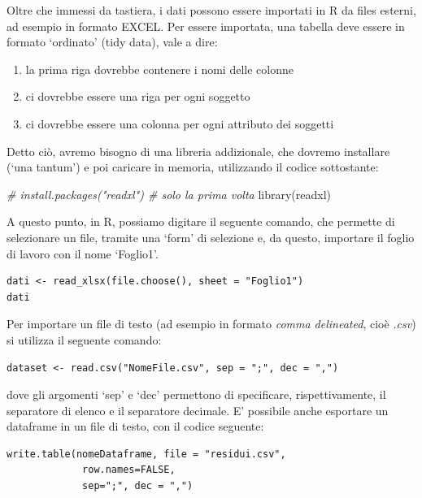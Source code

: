 \documentclass[
  12pt,
]{book}
\newenvironment{Shaded}{\begin{snugshade}}{\end{snugshade}}
\newcommand{\CommentTok}[1]{\textcolor[rgb]{0.56,0.35,0.01}{\textit{#1}}}
\newcommand{\FunctionTok}[1]{\textcolor[rgb]{0.00,0.00,0.00}{#1}}
\newcommand{\NormalTok}[1]{#1}
\providecommand{\tightlist}{%
  \setlength{\itemsep}{0pt}\setlength{\parskip}{0pt}}
\begin{document}
Oltre che immessi da tastiera, i dati possono essere importati in R da files esterni, ad esempio in formato EXCEL. Per essere importata, una tabella deve essere in formato `ordinato' (tidy data), vale a dire:

\begin{enumerate}
\def\labelenumi{\arabic{enumi}.}
\tightlist
\item
  la prima riga dovrebbe contenere i nomi delle colonne
\item
  ci dovrebbe essere una riga per ogni soggetto
\item
  ci dovrebbe essere una colonna per ogni attributo dei soggetti
\end{enumerate}

Detto ciò, avremo bisogno di una libreria addizionale, che dovremo installare (`una tantum') e poi caricare in memoria, utilizzando il codice sottostante:

\begin{Shaded}
\begin{Highlighting}[]
\CommentTok{\# install.packages("readxl") \# solo la prima volta}
\FunctionTok{library}\NormalTok{(readxl)}
\end{Highlighting}
\end{Shaded}

A questo punto, in R, possiamo digitare il seguente comando, che permette di selezionare un file, tramite una `form' di selezione e, da questo, importare il foglio di lavoro con il nome `Foglio1'.

\begin{verbatim}
dati <- read_xlsx(file.choose(), sheet = "Foglio1")
dati
\end{verbatim}

Per importare un file di testo (ad esempio in formato \emph{comma delineated}, cioè \emph{.csv}) si utilizza il seguente comando:

\begin{verbatim}
dataset <- read.csv("NomeFile.csv", sep = ";", dec = ",")
\end{verbatim}

dove gli argomenti `sep' e `dec' permettono di specificare, rispettivamente, il separatore di elenco e il separatore decimale. E' possibile anche esportare un dataframe in un file di testo, con il codice seguente:

\begin{verbatim}
write.table(nomeDataframe, file = "residui.csv", 
             row.names=FALSE, 
             sep=";", dec = ",")
\end{verbatim}
\end{document}
